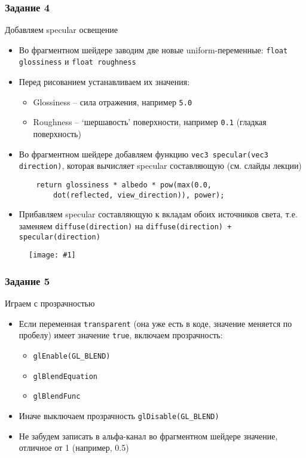 \documentclass{beamer}
\newcommand{\slideimage}[1]{
  \begin{figure}
    \begin{adjustbox}{width=\textwidth, totalheight=\textheight-2\baselineskip-2\baselineskip,keepaspectratio}
      \texttt{[image: \#1]}
    \end{adjustbox}
  \end{figure}
}
\begin{document}
\begin{frame}[fragile]
\frametitle{Задание 4}
Добавляем specular освещение
\begin{itemize}
\item Во фрагментном шейдере заводим две новые uniform-переменные: \verb|float glossiness| и \verb|float roughness|
\item Перед рисованием устанавливаем их значения:
\begin{itemize}
\item Glossiness -- сила отражения, например \verb|5.0|
\item Roughness -- `шершавость' поверхности, например \verb|0.1| (гладкая поверхность)
\end{itemize}
\item Во фрагментном шейдере добавляем функцию \verb|vec3 specular(vec3 direction)|, которая вычисляет specular составляющую (см. слайды лекции)
\begin{verbatim}
    return glossiness * albedo * pow(max(0.0,
        dot(reflected, view_direction)), power);
\end{verbatim}
\item Прибавляем specular составляющую к вкладам обоих источников света, т.е. заменяем \verb|diffuse(direction)| на \verb|diffuse(direction) + specular(direction)|
\end{itemize}
\end{frame}

\begin{frame}[fragile]
\slideimage{4.png}
\end{frame}

\begin{frame}[fragile]
\frametitle{Задание 5}
Играем с прозрачностью
\begin{itemize}
\item Если переменная \verb|transparent| (она уже есть в коде, значение меняется по пробелу) имеет значение \verb|true|, включаем прозрачность:
\begin{itemize}
\item \verb|glEnable(GL_BLEND)|
\item \verb|glBlendEquation|
\item \verb|glBlendFunc|
\end{itemize}
\item Иначе выключаем прозрачность \verb|glDisable(GL_BLEND)|
\item Не забудем записать в альфа-канал во фрагментном шейдере значение, отличное от 1 (например, 0.5)
\end{itemize}
\end{frame}
\end{document}
